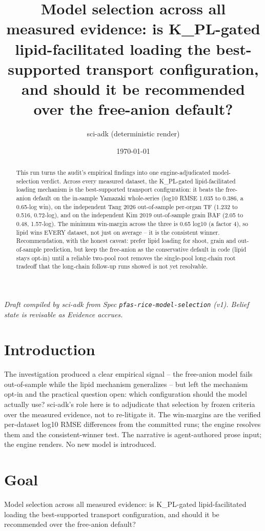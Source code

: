 \documentclass{article}
\title{Model selection across all measured evidence: is K\_PL-gated lipid-facilitated loading the best-supported transport configuration, and should it be recommended over the free-anion default?}
\author{sci-adk (deterministic render)}
\date{\today}
\begin{document}
\maketitle

\noindent\textit{Draft compiled by sci-adk from Spec \texttt{pfas-rice-model-selection} (v1). Belief state is revisable as Evidence accrues.}

\begin{abstract}
This run turns the audit's empirical findings into one engine-adjudicated model-selection verdict. Across every measured dataset, the K\_PL-gated lipid-facilitated loading mechanism is the best-supported transport configuration: it beats the free-anion default on the in-sample Yamazaki whole-series (log10 RMSE 1.035 to 0.386, a 0.65-log win), on the independent Tang 2026 out-of-sample per-organ TF (1.232 to 0.516, 0.72-log), and on the independent Kim 2019 out-of-sample grain BAF (2.05 to 0.48, 1.57-log). The minimum win-margin across the three is 0.65 log10 (a factor 4), so lipid wins EVERY dataset, not just on average -- it is the consistent winner. Recommendation, with the honest caveat: prefer lipid loading for shoot, grain and out-of-sample prediction, but keep the free-anion as the conservative default in code (lipid stays opt-in) until a reliable two-pool root removes the single-pool long-chain root tradeoff that the long-chain follow-up runs showed is not yet resolvable.
\end{abstract}

\section{Introduction}
The investigation produced a clear empirical signal -- the free-anion model fails out-of-sample while the lipid mechanism generalizes -- but left the mechanism opt-in and the practical question open: which configuration should the model actually use? sci-adk's role here is to adjudicate that selection by frozen criteria over the measured evidence, not to re-litigate it. The win-margins are the verified per-dataset log10 RMSE differences from the committed runs; the engine resolves them and the consistent-winner test. The narrative is agent-authored prose input; the engine renders. No new model is introduced.

\section{Goal}
Model selection across all measured evidence: is K\_PL-gated lipid-facilitated loading the best-supported transport configuration, and should it be recommended over the free-anion default?
\end{document}
